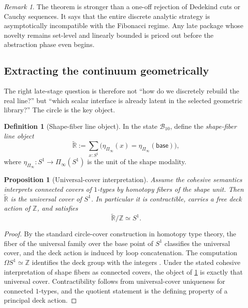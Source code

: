 \documentclass[11pt]{article}
\theoremstyle{plain}
\newtheorem{proposition}[theorem]{Proposition}
\theoremstyle{definition}
\newtheorem{definition}[theorem]{Definition}
\theoremstyle{remark}
\newtheorem{remark}[theorem]{Remark}
\newcommand{\Z}{\mathbb{Z}}
\newcommand{\R}{\mathbb{R}}
\newcommand{\B}{\mathcal{B}}
\newcommand{\Shape}{\Pi_{\!\infty}}
\begin{document}
\begin{remark}
The theorem is stronger than a one-off rejection of Dedekind cuts or Cauchy sequences. It says that the entire discrete analytic strategy is asymptotically incompatible with the Fibonacci regime. Any late package whose novelty remains set-level and linearly bounded is priced out before the abstraction phase even begins.
\end{remark}

\subsection{Extracting the continuum geometrically}

The right late-stage question is therefore not ``how do we discretely rebuild the real line?'' but ``which scalar interface is already latent in the selected geometric library?'' The circle is the key object.

\begin{definition}[Shape-fiber line object]
\label{def:shape-fiber-line}
In the state $\B_{10}$, define the \emph{shape-fiber line object}
\[
  \widetilde{\R}
  :=
  \sum_{x:S^1}\bigl(\eta_{\Shape}(x)=\eta_{\Shape}(\mathsf{base})\bigr),
\]
where $\eta_{\Shape}:S^1\to\Shape(S^1)$ is the unit of the shape modality.
\end{definition}

\begin{proposition}[Universal-cover interpretation]
\label{prop:universal-cover}
Assume the cohesive semantics interprets connected covers of $1$-types by homotopy fibers of the shape unit. Then $\widetilde{\R}$ is the universal cover of $S^1$. In particular it is contractible, carries a free deck action of $\Z$, and satisfies
\[
  \widetilde{\R}/\Z\simeq S^1.
\]
\end{proposition}

\begin{proof}
By the standard circle-cover construction in homotopy type theory, the fiber of the universal family over the base point of $S^1$ classifies the universal cover, and the deck action is induced by loop concatenation. The computation $\Omega S^1\simeq \Z$ identifies the deck group with the integers \citep{licata-shulman}. Under the stated cohesive interpretation of shape fibers as connected covers, the object of \cref{def:shape-fiber-line} is exactly that universal cover. Contractibility follows from universal-cover uniqueness for connected $1$-types, and the quotient statement is the defining property of a principal deck action.
\end{proof}
\end{document}
